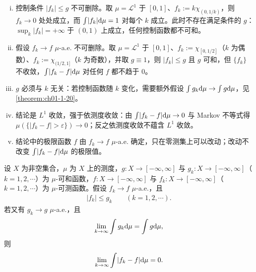 \documentclass[../../main.tex]{subfiles}%
\begin{document}
\begin{remark}\label{remark:ch01-thm-1-19-条件}
\begin{enumerate}[(i)]
\item 控制条件 $\lvert f_k\rvert\leqslant g$ 不可删除。取 $\mu=\mathcal{L}^1$ 于 $[0,1]$、$f_k:=k\chi_{(0,1/k)}$，则 $f_k\to0$ 处处成立，而 $\int\lvert f_k\rvert\mathrm{d}\mu=1$ 对每个 $k$ 成立。此时不存在满足条件的 $g$：$\sup_{k}\lvert f_k\rvert=+\infty$ 于 $(0,1)$ 上成立，任何控制函数都不可和。
\item 假设 $f_k\to f$ $\mu$-a.e. 不可删除。取 $\mu=\mathcal{L}^1$ 于 $[0,1]$、$f_k:=\chi_{[0,1/2]}$（$k$ 为偶数）、$f_k:=\chi_{(1/2,1]}$（$k$ 为奇数），并取 $g\equiv1$，则 $\lvert f_k\rvert\leqslant g$ 且 $g$ 可和，但 $\{f_k\}$ 不收敛，$\int\lvert f_k-f\rvert\mathrm{d}\mu$ 对任何 $f$ 都不趋于 $0$。
\item $g$ 必须与 $k$ 无关：若控制函数随 $k$ 变化，需要额外假设 $\int g_k\mathrm{d}\mu\to\int g\mathrm{d}\mu$，见\cref{theorem:ch01-1-20}。%
\item 结论是 $L^1$ 收敛，强于依测度收敛：由 $\int\lvert f_k-f\rvert\mathrm{d}\mu\to0$ 与 Markov 不等式得 $\mu(\{\lvert f_k-f\rvert>\varepsilon\})\to0$；反之依测度收敛不蕴含 $L^1$ 收敛。
\item 结论中的极限函数 $f$ 由 $f_k\to f$ $\mu$-a.e. 确定，只在零测集上可以改动；改动不改变 $\int\lvert f_k-f\rvert\mathrm{d}\mu$ 的极限值。
\end{enumerate}
\end{remark}

\begin{theorem}[控制收敛定理的变体]\label{theorem:ch01-1-20}
设 $X$ 为非空集合，$\mu$ 为 $X$ 上的测度，$g:X\to[-\infty,\infty]$ 与 $g_k:X\to[-\infty,\infty]$（$k=1,2,\cdots$）为 $\mu$-可和函数，$f:X\to[-\infty,\infty]$ 与 $f_k:X\to[-\infty,\infty]$（$k=1,2,\cdots$）为 $\mu$-可测函数。假设 $f_k\to f$ $\mu$-a.e.，且
\begin{align*}
\lvert f_k\rvert\leqslant g_k\qquad(k=1,2,\cdots).
\end{align*}
若又有 $g_k\to g$ $\mu$-a.e.，且
\begin{align*}
\lim_{k\to\infty}\int g_k\mathrm{d}\mu=\int g\mathrm{d}\mu,
\end{align*}
则
\begin{align}
\lim_{k\to\infty}\int\lvert f_k-f\rvert\mathrm{d}\mu=0 .\label{align:ch01-1-20-变体}
\end{align}
\end{theorem}
\end{document}
